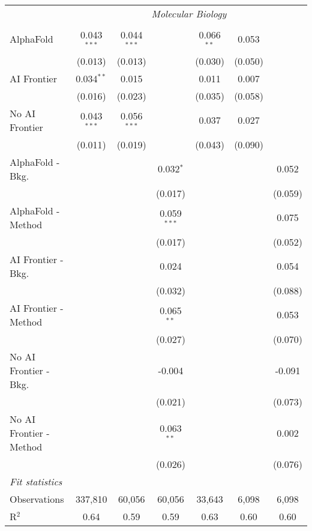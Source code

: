 \begin{tabular}{lcccccc}
 & \multicolumn{6}{c}{\textit{Molecular Biology}} \\ \\
   AlphaFold               & 0.043$^{***}$ & 0.044$^{***}$ &               & 0.066$^{**}$ & 0.053   &   \\   
                           & (0.013)       & (0.013)       &               & (0.030)      & (0.050) &   \\   
   AI Frontier             & 0.034$^{**}$  & 0.015         &               & 0.011        & 0.007   &   \\   
                           & (0.016)       & (0.023)       &               & (0.035)      & (0.058) &   \\   
   No AI Frontier          & 0.043$^{***}$ & 0.056$^{***}$ &               & 0.037        & 0.027   &   \\   
                           & (0.011)       & (0.019)       &               & (0.043)      & (0.090) &   \\   
   AlphaFold - Bkg.        &               &               & 0.032$^{*}$   &              &         & 0.052\\   
                           &               &               & (0.017)       &              &         & (0.059)\\   
   AlphaFold - Method      &               &               & 0.059$^{***}$ &              &         & 0.075\\   
                           &               &               & (0.017)       &              &         & (0.052)\\   
   AI Frontier - Bkg.      &               &               & 0.024         &              &         & 0.054\\   
                           &               &               & (0.032)       &              &         & (0.088)\\   
   AI Frontier - Method    &               &               & 0.065$^{**}$  &              &         & 0.053\\   
                           &               &               & (0.027)       &              &         & (0.070)\\   
   No AI Frontier - Bkg.   &               &               & -0.004        &              &         & -0.091\\   
                           &               &               & (0.021)       &              &         & (0.073)\\   
   No AI Frontier - Method &               &               & 0.063$^{**}$  &              &         & 0.002\\   
                           &               &               & (0.026)       &              &         & (0.076)\\   
   \midrule
   \emph{Fit statistics}\\
   Observations            & 337,810       & 60,056        & 60,056        & 33,643       & 6,098   & 6,098\\  
   R$^2$                   & 0.64          & 0.59          & 0.59          & 0.63         & 0.60    & 0.60\\  
   

\end{tabular}
